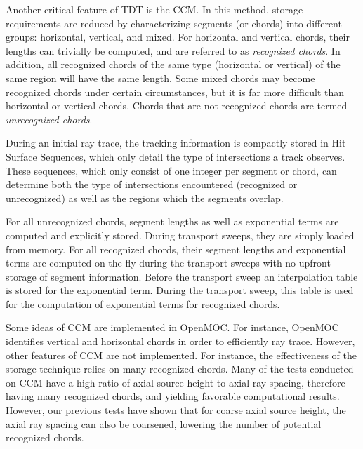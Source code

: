 Another critical feature of TDT is the \ac{CCM}. In this method, storage requirements are reduced by characterizing segments (or chords) into different groups: horizontal, vertical, and mixed. For horizontal and vertical chords, their lengths can trivially be computed, and are referred to as \textit{recognized chords}. In addition, all recognized chords of the same type (horizontal or vertical) of the same region will have the same length. Some mixed chords may become recognized chords under certain circumstances, but it is far more difficult than horizontal or vertical chords. Chords that are not recognized chords are termed \textit{unrecognized chords}.

During an initial ray trace, the tracking information is compactly stored in Hit Surface Sequences, which only detail the type of intersections a track observes. These sequences, which only consist of one integer per segment or chord, can determine both the type of intersections encountered (recognized or unrecognized) as well as the regions which the segments overlap.

For all unrecognized chords, segment lengths as well as exponential terms are computed and explicitly stored. During transport sweeps, they are simply loaded from memory. For all recognized chords, their segment lengths and exponential terms are computed on-the-fly during the transport sweeps with no upfront storage of segment information. Before the transport sweep an interpolation table is stored for the exponential term. During the transport sweep, this table is used for the computation of exponential terms for recognized chords. 

Some ideas of \ac{CCM} are implemented in OpenMOC. For instance, OpenMOC identifies vertical and horizontal chords in order to efficiently ray trace. However, other features of \ac{CCM} are not implemented. For instance, the effectiveness of the storage technique relies on many recognized chords. Many of the tests conducted on \ac{CCM} have a high ratio of axial source height to axial ray spacing, therefore having many recognized chords, and yielding favorable computational results. However, our previous tests have shown that for coarse axial source height, the axial ray spacing can also be coarsened, lowering the number of potential recognized chords.



